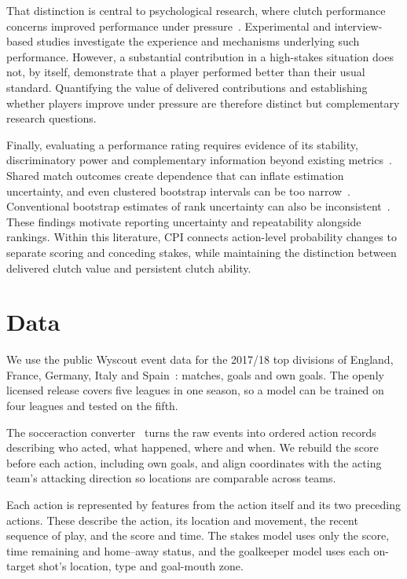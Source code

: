 \documentclass[runningheads]{llncs}
\begin{document}
{ That distinction is central to psychological research, where clutch performance concerns improved performance under pressure~\cite{otten2009,swann2017}. Experimental and interview-based studies investigate the experience and mechanisms underlying such performance. However, a substantial contribution in a high-stakes situation does not, by itself, demonstrate that a player performed better than their usual standard. Quantifying the value of delivered contributions and establishing whether players improve under pressure are therefore distinct but complementary research questions.\par}

{ Finally, evaluating a performance rating requires evidence of its stability, discriminatory power and complementary information beyond existing metrics~\cite{franks2016}. Shared match outcomes create dependence that can inflate estimation uncertainty, and even clustered bootstrap intervals can be too narrow~\cite{brill2025}. Conventional bootstrap estimates of rank uncertainty can also be inconsistent~\cite{hall2009}. These findings motivate reporting uncertainty and repeatability alongside rankings. Within this literature, CPI connects action-level probability changes to separate scoring and conceding stakes, while maintaining the distinction between delivered clutch value and persistent clutch ability.\par}

\section{Data}
\label{sec:data}
We use the public Wyscout event data for the 2017/18 top divisions of England, France, Germany, Italy and Spain~\cite{pappalardo2019}: \nMatches{} matches, \nGoals{} goals and \nOwnGoals{} own goals. The openly licensed release covers five leagues in one season, so a model can be trained on four leagues and tested on the fifth.

The socceraction converter~\cite{socceraction} turns the raw events into \nActions{} ordered action records describing who acted, what happened, where and when. We rebuild the score before each action, including own goals, and align coordinates with the acting team's attacking direction so locations are comparable across teams.

Each action is represented by \nFeatures{} features from the action itself and its two preceding actions. These describe the action, its location and movement, the recent sequence of play, and the score and time. The stakes model uses only the score, time remaining and home--away status, and the goalkeeper model uses each on-target shot's location, type and goal-mouth zone.
\end{document}
